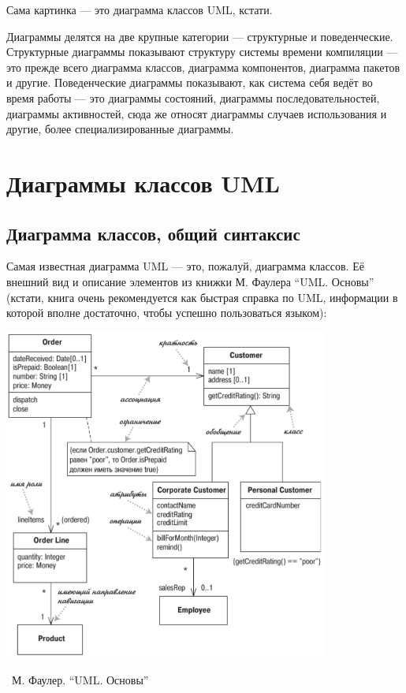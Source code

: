 \documentclass[a5paper]{article}
\newcommand{\attribution}[1] {
	\vspace{-5mm}\begin{flushright}\begin{scriptsize}%
	{\textcopyright\, #1}\end{scriptsize}\end{flushright}
}
\begin{document}
Сама картинка --- это диаграмма классов UML, кстати.

Диаграммы делятся на две крупные категории --- структурные и поведенческие. Структурные диаграммы показывают структуру системы времени компиляции --- это прежде всего диаграмма классов, диаграмма компонентов, диаграмма пакетов и другие. Поведенческие диаграммы показывают, как система себя ведёт во время работы --- это диаграммы состояний, диаграммы последовательностей, диаграммы активностей, сюда же относят диаграммы случаев использования и другие, более специализированные диаграммы.

\section{Диаграммы классов UML}

\subsection{Диаграмма классов, общий синтаксис}

Самая известная диаграмма UML --- это, пожалуй, диаграмма классов. Её внешний вид и описание элементов из книжки М. Фаулера ``UML. Основы'' (кстати, книга очень рекомендуется как быстрая справка по UML, информации в которой вполне достаточно, чтобы успешно пользоваться языком):

\begin{center}
	\includegraphics[width=0.8\textwidth]{umlClassDiagram.png}
	\attribution{М. Фаулер. ``UML. Основы''}
\end{center}
\end{document}

